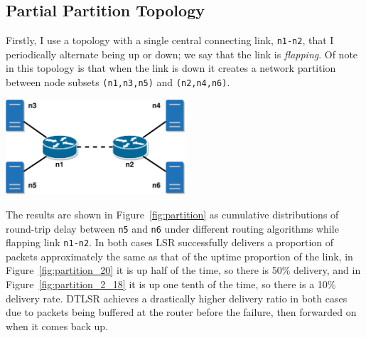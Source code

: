 \documentclass[withindex,glossary,openany]{cam-thesis}
\begin{document}
\subsection{Partial Partition Topology}
\label{subsec:partial_partition}

Firstly, I use a topology with a single central connecting link, \texttt{n1-n2}, that I periodically alternate being up or down; we say that the link is \textit{flapping}. Of note in this topology is that when the link is down it creates a network partition between node subsets \texttt{(n1,n3,n5)} and \texttt{(n2,n4,n6)}.

\begin{minipage}{1\textwidth} \centering
	\includegraphics[width=0.5\textwidth]{delay_partition_topology}
	\label{fig:partition_topology}
\end{minipage}

The results are shown in Figure~\ref{fig:partition} as cumulative distributions of round-trip delay between \texttt{n5} and \texttt{n6} under different routing algorithms while flapping link \texttt{n1-n2}. In both cases LSR successfully delivers a proportion of packets approximately the same as that of the uptime proportion of the link, in Figure~\ref{fig:partition_20} it is up half of the time, so there is 50\% delivery, and in Figure~\ref{fig:partition_2_18} it is up one tenth of the time, so there is a 10\% delivery rate. DTLSR achieves a drastically higher delivery ratio in both cases due to packets being buffered at the router before the failure, then forwarded on when it comes back up.
\end{document}

